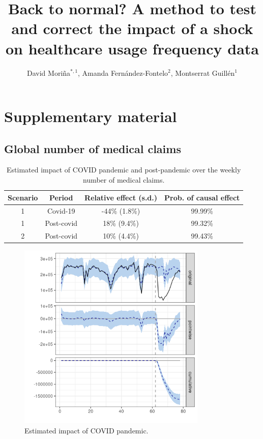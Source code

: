 \documentclass[9pt]{osa-supplemental-document}
\title{Back to normal? A method to test and correct the impact of a shock on healthcare usage frequency data}
\author{David Mori\~na$^{*,1}$, Amanda Fern\'andez-Fontelo$^2$, Montserrat Guill\'en$^1$}
\begin{document}
\maketitle

\section{Supplementary material}
\subsection{Global number of medical claims}\label{global}
\begin{table}[H]\caption{Estimated impact of COVID pandemic and post-pandemic over the weekly number of medical claims.}
  \centering  
    \begin{tabular}{ |c|c|c|c| }
        \hline
     \textbf{Scenario} & \textbf{Period} & \textbf{Relative effect (s.d.)} & \textbf{Prob. of causal effect} \\ 
     \hline
     1 & Covid-19 & -44\% (1.8\%) & 99.99\% \\  
     1 & Post-covid & 18\% (9.4\%) & 99.32\% \\
     \hline   
     2 & Post-covid & 10\% (4.4\%) & 99.43\% \\
     \hline
    \end{tabular}
\end{table}

\begin{center}
    \begin{figure}[H]
      \includegraphics[width=9cm]{global_covid.png}\caption{Estimated impact of COVID pandemic.}
    \end{figure}\label{global_covid}
    \end{center}
\end{document}
